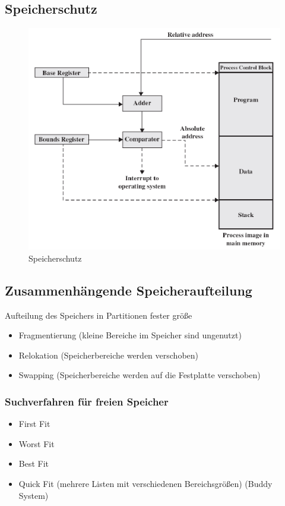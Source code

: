 \subsection{Speicherschutz}
\begin{figure}[ht!]
    \includegraphics[scale=.6]{pics/memory_access}
    \caption{Speicherschutz}
\end{figure}

\subsection{Zusammenhängende Speicheraufteilung}
Aufteilung des Speichers in Partitionen fester größe

\begin{itemize}
    \item Fragmentierung (kleine Bereiche im Speicher sind ungenutzt)
    \item Relokation (Speicherbereiche werden verschoben)
    \item Swapping (Speicherbereiche werden auf die Festplatte verschoben)
\end{itemize}

\subsubsection{Suchverfahren für freien Speicher}
\begin{itemize}
    \item First Fit
    \item Worst Fit
    \item Best Fit
    \item Quick Fit (mehrere Listen mit verschiedenen Bereichsgrößen) (Buddy System)
\end{itemize}

